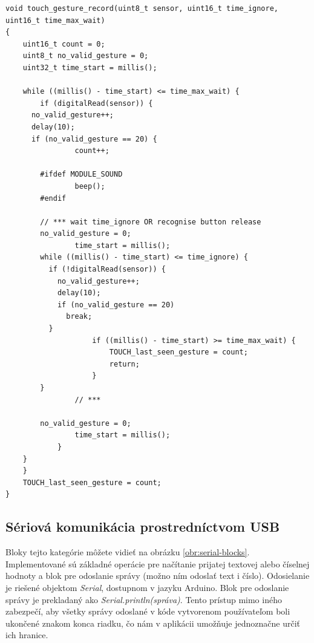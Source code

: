 
\newpage

\begin{lstlisting}[frame=single]
void touch_gesture_record(uint8_t sensor, uint16_t time_ignore, uint16_t time_max_wait)
{
	uint16_t count = 0;
	uint8_t no_valid_gesture = 0;
	uint32_t time_start = millis();

	while ((millis() - time_start) <= time_max_wait) {
		if (digitalRead(sensor)) {
      no_valid_gesture++;
      delay(10);
      if (no_valid_gesture == 20) {
				count++;
				
        #ifdef MODULE_SOUND
				beep();
        #endif

        // *** wait time_ignore OR recognise button release
        no_valid_gesture = 0;
				time_start = millis();
        while ((millis() - time_start) <= time_ignore) {
          if (!digitalRead(sensor)) {
            no_valid_gesture++;
            delay(10);
            if (no_valid_gesture == 20)
              break;
          }
					if ((millis() - time_start) >= time_max_wait) {
						TOUCH_last_seen_gesture = count;
						return;
					}
        }
				// ***
        
        no_valid_gesture = 0;
				time_start = millis();
			}
    }
	}
	TOUCH_last_seen_gesture = count;
}

\end{lstlisting}



\subsection{Sériová komunikácia prostredníctvom USB}
Bloky tejto kategórie môžete vidieť na obrázku \ref{obr:serial-blocks}. Implementované sú základné operácie pre načítanie prijatej textovej alebo číselnej hodnoty a blok pre odoslanie správy (možno ním odoslať text i číslo). Odosielanie je riešené objektom \textit{Serial}, dostupnom v jazyku Arduino. Blok pre odoslanie správy je prekladaný ako \textit{Serial.println(správa)}. Tento prístup mimo iného zabezpečí, aby všetky správy odoslané v kóde vytvorenom používateľom boli ukončené znakom konca riadku, čo nám v aplikácii umožňuje jednoznačne určiť ich hranice.

